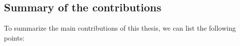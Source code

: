 


\subsection{Summary of the contributions}
\label{sec:1:summaryOfContributions}

To summarize the main contributions of this thesis, we can list the following points:

